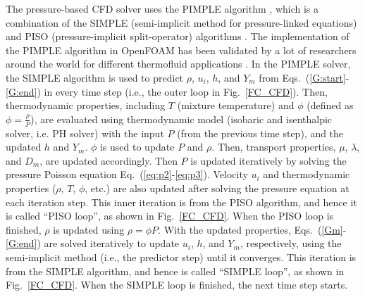 
The pressure-based CFD solver uses the PIMPLE algorithm \cite{holzmann2016mathematics}, which is a combination of the SIMPLE (semi-implicit method for pressure-linked equations) \cite{patankar1983calculation} and PISO (pressure-implicit split-operator) algorithms \cite{issa1986solution}. The implementation of the PIMPLE algorithm in OpenFOAM has been validated by a lot of researchers around the world for different thermofluid applications \cite{robertson2015validation, higuera2014three,gaikwad2019openfoam,gamet2020validation,de2017implementation,ashton2019verification}. %
In the PIMPLE solver, the SIMPLE algorithm is used to predict $\rho$, $u_i$, $h$, and $Y_m$ from Eqs.~(\ref{G:start}-\ref{G:end}) in every time step (i.e., the outer loop in Fig.~\ref{FC_CFD}). Then, thermodynamic properties, including $T$ (mixture temperature) and $\phi$ (defined as $\phi = \frac{\rho} {P}$), are evaluated using thermodynamic model (isobaric and isenthalpic solver, i.e. PH solver) with the input $P$ (from the previous time step), and the updated $h$ and $Y_m$. %
$\phi$ is used to update $P$ and $\rho$. Then, transport properties, $\mu$, $\lambda$, and $D_m$, are updated accordingly. Then $P$ is updated iteratively by solving the pressure Poisson equation Eq.~(\ref{eq:p2}-\ref{eq:p3}). Velocity $u_i$ and thermodynamic properties ($\rho$, $T$, $\phi$, etc.) are also updated after solving the pressure equation at each iteration step. This inner iteration is from the PISO algorithm, and hence it is called ``PISO loop'', as shown in Fig.~\ref{FC_CFD}. When the PISO loop is finished, $\rho$ is updated using $ \rho = \phi P$. With the updated properties, Eqs.~(\ref{Gm}-\ref{G:end}) are solved iteratively to update $u_i$, $h$, and $Y_m$, respectively, using the semi-implicit method (i.e., the predictor step) until it converges. This iteration is from the SIMPLE algorithm, and hence is called ``SIMPLE loop'', as shown in Fig.~\ref{FC_CFD}. When the SIMPLE loop is finished, the next time step starts.


